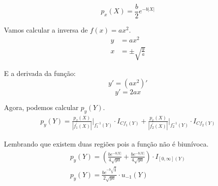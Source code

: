 \documentclass[a5paper]{report}
\begin{document}
\[p_x(X) = \frac{b}{2}e^{-b|X|}\]

Vamos calcular a inversa de $f(x) = ax^2$.
\begin{align*}
    y &= ax^2\\
    x &= \pm \sqrt{\frac{y}{a}}
\end{align*}

E a derivada da função:
\[y' = (ax^2)'\]
\[y' = 2ax\]

Agora, podemos calcular $p_y(Y)$.
\begin{align*}
    p_y(Y) = \frac{p_x(X)}{|f_1^{'}(X)|}\bigg|_{f_1^{-1}(Y)} \cdot I_{Cf_1(Y)} + \frac{p_x(X)}{|f_2^{'}(X)|}\bigg|_{f_2^{-1}(Y)} \cdot I_{Cf_2(Y)}
\end{align*}

Lembrando que existem duas regiões pois a função não é biunívoca.
\begin{align*}
    p_y(Y) = \left(\frac{be^{-b|X|}}{4\sqrt{ya}} + \frac{be^{-b|X|}}{4\sqrt{ya}}\right) \cdot I_{[0, \infty](Y)}\\
    \boxed{p_y(Y) = \frac{be^{-b\sqrt{\frac{y}{a}}}}{2\sqrt{ya}} \cdot u_{-1}(Y)}
\end{align*}
\end{document}
